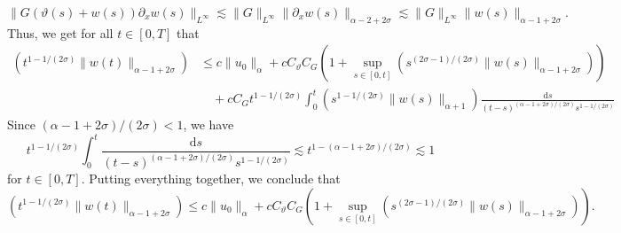\documentclass[11pt,a4paper]{article}
\newcommand{\mathd}{\mathrm{d}}
\theoremstyle{remark}
\begin{document}
\[
   \| G ( \vartheta ( s ) +w ( s ) ) \partial_{x} w ( s ) \|_{L^{\infty}} \lesssim \| G \|_{L^{\infty}} \| \partial_{x} w ( s ) \|_{\alpha -2+2 \sigma} \lesssim \| G \|_{L^{\infty}} \| w ( s ) \|_{\alpha -1+2 \sigma} .
\]
Thus, we get for all $t \in [ 0,T ]$ that
\begin{align*}
   ( t^{1-1/ ( 2 \sigma )} \| w ( t ) \|_{\alpha -1+2 \sigma} ) & \leqslant c \| u_{0} \|_{\alpha} +c C_{\vartheta} C_{G} ( 1+ \sup_{s \in [ 0,t ]} ( s^{( 2 \sigma -1 ) / ( 2 \sigma )} \| w ( s ) \|_{\alpha -1+2 \sigma} ) ) \\
   &\quad +c C_{G} t^{1-1/ ( 2 \sigma )} \int_{0}^{t} ( s^{1-1/ ( 2 \sigma )} \| w ( s ) \|_{\alpha +1} ) \frac{\mathd s}{( t-s )^{( \alpha -1+2 \sigma ) / ( 2 \sigma )} s^{1-1/ ( 2 \sigma )}}
\end{align*}
Since $( \alpha -1+2 \sigma ) / ( 2 \sigma ) <1$, we have
\[
   t^{1-1/ ( 2 \sigma )} \int_{0}^{t} \frac{\mathd s}{( t-s )^{( \alpha -1+2 \sigma ) / ( 2 \sigma )} s^{1-1/ ( 2 \sigma )}} \lesssim t^{1- ( \alpha -1+2 \sigma ) / ( 2 \sigma )} \lesssim 1
\]
for $t \in [ 0,T ]$. Putting everything together, we conclude that
\[
   ( t^{1-1/ ( 2 \sigma )} \| w ( t ) \|_{\alpha -1+2 \sigma} ) \leqslant c \| u_{0} \|_{\alpha} +c C_{\vartheta} C_{G} ( 1+ \sup_{s \in [ 0,t ]} ( s^{( 2 \sigma -1 ) / ( 2 \sigma )} \| w ( s ) \|_{\alpha -1+2 \sigma} ) ) .
\]
\end{document}
